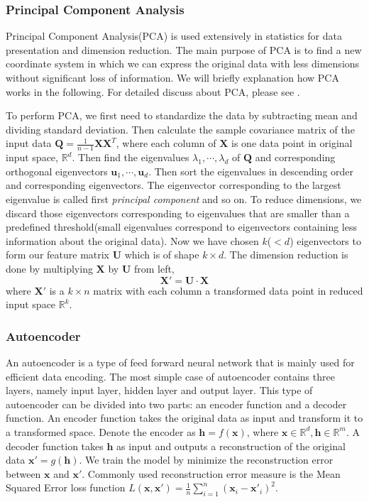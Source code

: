 \documentclass[11pt,a4paper]{article}
\theoremstyle{definition}
\numberwithin{equation}{section}
\let\vec\mathbf
\begin{document}
\subsubsection{Principal Component Analysis}
Principal Component Analysis(PCA) is used extensively in statistics for data presentation and dimension reduction. The main purpose of PCA is to find a new coordinate system in which we can express the original data with less dimensions without significant loss of information. We will briefly explanation how PCA works in the following. For detailed discuss about PCA, please see \cite[Jolliffe]{Jolliffe}.

To perform PCA, we first need to standardize the data by subtracting mean and dividing standard deviation. Then calculate the sample covariance matrix of the input data $\vec Q = \frac{1}{n-1}\vec X\vec X^T$, where each column of $\vec X$ is one data point in original input space, $\mathbb R^d$. Then find the eigenvalues $\lambda_1, \cdots,\lambda_d$ of $\vec Q$ and corresponding orthogonal eigenvectors $\vec u_1,\cdots,\vec u_d$. Then sort the eigenvalues in descending order and corresponding eigenvectors. The eigenvector corresponding to the largest eigenvalue is called first \textit{principal component} and so on. To reduce dimensions, we discard those eigenvectors corresponding to eigenvalues that are smaller than a predefined threshold(small eigenvalues correspond to eigenvectors containing less information about the original data). Now we have chosen $k$($<d$) eigenvectors to form our feature matrix $\vec U$ which is of shape $k\times d$. The dimension reduction is done by multiplying $\vec X$ by $\vec U$ from left,
\begin{equation}
\vec X' = \vec U \cdot \vec X
\end{equation}
where $\vec X'$ is a $k\times n$ matrix with each column a transformed data point in reduced input space $\mathbb R^k$.

\subsubsection{Autoencoder}
An autoencoder is a type of feed forward neural network that is mainly used for efficient data encoding\cite[chapter 14]{Deep_Learning}. The most simple case of autoencoder contains three layers, namely input layer, hidden layer and output layer. This type of autoencoder can be divided into two parts: an encoder function and a decoder function. An encoder function takes the original data as input and transform it to a transformed space. Denote the encoder as $\vec h = f(\vec x)$, where $\vec x\in \mathbb R^d, \vec h\in \mathbb R^m$. A decoder function takes $\vec h$ as input and outputs a reconstruction of the original data $\vec x' = g(\vec h)$. We train the model by minimize the reconstruction error between $\vec x$ and $\vec x'$. Commonly used reconstruction error measure is the Mean Squared Error loss function $L(\vec x,\vec x') = \frac{1}{n}\sum_{i=1}^{n}(\vec x_i-\vec x'_i)^2$. 
\end{document}
